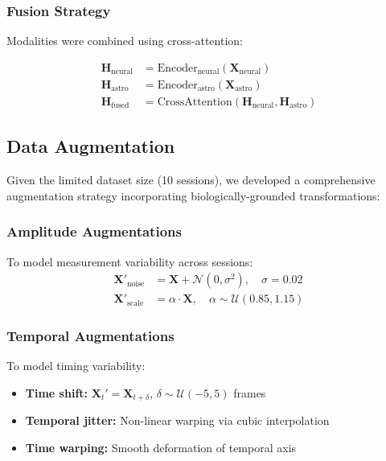 \documentclass[11pt,twocolumn]{article}
\begin{document}
\subsubsection{Fusion Strategy}
Modalities were combined using cross-attention:

\begin{align}
\mathbf{H}_{\text{neural}} &= \text{Encoder}_{\text{neural}}(\mathbf{X}_{\text{neural}}) \\
\mathbf{H}_{\text{astro}} &= \text{Encoder}_{\text{astro}}(\mathbf{X}_{\text{astro}}) \\
\mathbf{H}_{\text{fused}} &= \text{CrossAttention}(\mathbf{H}_{\text{neural}}, \mathbf{H}_{\text{astro}})
\end{align}

\subsection{Data Augmentation}

Given the limited dataset size (10 sessions), we developed a comprehensive augmentation strategy incorporating biologically-grounded transformations:

\subsubsection{Amplitude Augmentations}
To model measurement variability across sessions:
\begin{align}
\mathbf{X}'_{\text{noise}} &= \mathbf{X} + \mathcal{N}(0, \sigma^2), \quad \sigma = 0.02 \\
\mathbf{X}'_{\text{scale}} &= \alpha \cdot \mathbf{X}, \quad \alpha \sim \mathcal{U}(0.85, 1.15)
\end{align}

\subsubsection{Temporal Augmentations}
To model timing variability:
\begin{itemize}
    \item \textbf{Time shift:} $\mathbf{X}_{t}' = \mathbf{X}_{t+\delta}$, $\delta \sim \mathcal{U}(-5, 5)$ frames
    \item \textbf{Temporal jitter:} Non-linear warping via cubic interpolation
    \item \textbf{Time warping:} Smooth deformation of temporal axis
\end{itemize}
\end{document}
